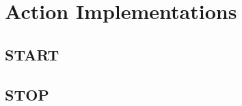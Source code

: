 \documentclass{scrreprt}
\begin{document}
\chapter{Action Implementations}

\section{START}

\section{STOP}
\end{document}
